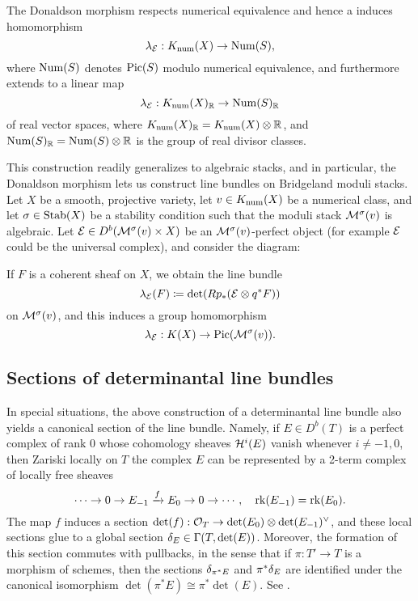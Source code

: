 The Donaldson morphism respects numerical equivalence and hence a induces homomorphism
\[ \lambda_{\mathcal{E}}: K_{\mathrm{num}}(X) \to \mathrm{Num}(S), \]
where $\mathrm{Num}(S)$ denotes $\mathrm{Pic}(S)$ modulo numerical equivalence, and furthermore extends to a linear map
\[ \lambda_{\mathcal{E}}: K_{\mathrm{num}}(X)_{\mathbb{R}} \to \mathrm{Num}(S)_{\mathbb{R}} \]
of real vector spaces, where $K_{\mathrm{num}}(X)_{\mathbb{R}} = K_{\mathrm{num}}(X) \otimes \mathbb{R}$, and $\mathrm{Num}(S)_{\mathbb{R}} = \mathrm{Num}(S) \otimes \mathbb{R}$ is the group of real divisor classes.

This construction readily generalizes to algebraic stacks, and in particular, the Donaldson morphism lets us construct line bundles on Bridgeland moduli stacks. Let $X$ be a smooth, projective variety, let $v \in K_{\mathrm{num}}(X)$ be a numerical class, and let $\sigma \in \operatorname{\mathrm{Stab}}(X)$ be a stability condition such that the moduli stack $\mathcal{M}^\sigma(v)$ is algebraic. Let $\mathcal{E} \in D^b(\mathcal{M}^\sigma(v) \times X)$ be an $\mathcal{M}^\sigma(v)$-perfect object (for example $\mathcal{E}$ could be the universal complex), and consider the diagram:
\begin{center}
\end{center}
If $F$ is a coherent sheaf on $X$, we obtain the line bundle
\[ \lambda_{\mathcal{E}}(F) \coloneqq \det(R p_*(\mathcal{E} \otimes q^*F)) \]
on $\mathcal{M}^\sigma(v)$, and this induces a group homomorphism
\[ \lambda_{\mathcal{E}}: K(X) \to \mathrm{Pic}(\mathcal{M}^\sigma(v)). \]


\subsection{Sections of determinantal line bundles}
In special situations, the above construction of a determinantal line bundle also yields a canonical section of the line bundle. Namely, if $E \in D^b(T)$ is a perfect complex of rank 0 whose cohomology sheaves $\mathcal{H}^i(E)$ vanish whenever $i \neq -1,0$, then Zariski locally on $T$ the complex $E$ can be represented by a 2-term complex of locally free sheaves
\[ \cdots \to 0 \to E_{-1} \xrightarrow{f} E_0 \to 0 \to \cdots, \quad \operatorname{\mathrm{rk}}(E_{-1}) = \operatorname{\mathrm{rk}}(E_0). \]
The map $f$ induces a section $\det(f): \mathcal{O}_T \to \det(E_0) \otimes \det(E_{-1})^\vee$, and these local sections glue to a global section $\delta_E \in \Gamma(T, \det(E))$. Moreover, the formation of this section commutes with pullbacks, in the sense that if $\pi: T' \to T$ is a morphism of schemes, then the sections $\delta_{\pi^*E}$ and $\pi^*\delta_E$ are identified under the canonical isomorphism $\det(\pi^* E) \cong \pi^*\det(E)$. See \cite[\href{https://stacks.math.columbia.edu/tag/0FJX}{Tag 0FJX}]{stacks-project}.

